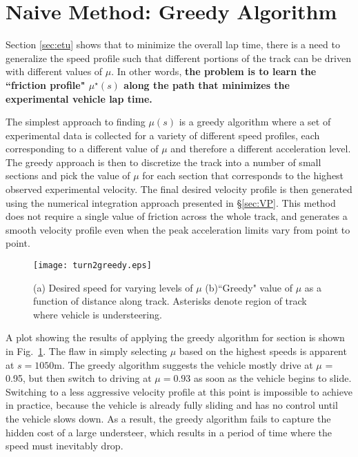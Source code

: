 {{{\section{Naive Method: Greedy Algorithm}
\label{sec:greedy}

Section \ref{sec:etu} shows that to  minimize the overall lap time, there is a need to generalize the speed profile such that different portions of the track can be driven with different
values of $\mu$. In other words, \textbf{the problem is to learn the ``friction profile" $\mu^\star(s)$ along the path that minimizes the experimental vehicle lap time.} 

The simplest approach to finding $\mu(s)$ is a greedy algorithm where a set of experimental data is collected for a variety of different
speed profiles, each corresponding to a different value of $\mu$ and therefore a different acceleration level. The greedy approach is then to discretize
the track into a number of small sections and pick the value of $\mu$ for each section that corresponds to the highest observed experimental velocity.
The final desired velocity profile is then generated using the numerical integration approach presented in \S \ref{sec:VP}. This method does not require a single 
value of friction across the whole track, and generates a smooth velocity profile even when the peak acceleration limits vary from point to point. 

 \begin{figure}[tb]
\centering
\texttt{[image: turn2greedy.eps]}
\caption[Greedy algorithm results for region 2.]{(a) Desired speed for varying levels of $\mu$ (b)``Greedy" value of $\mu$ as a function of distance along track. Asterisks denote
region of track where vehicle is understeering.}
\label{fig:t2g}
\end{figure}

A plot showing the results of applying the greedy algorithm for section  is shown in Fig.~\ref{fig:t2g}. The flaw in simply
selecting $\mu$ based on the highest speeds is apparent at $s = 1050 \mathrm{m}$. The greedy algorithm suggests the vehicle mostly drive at $\mu$ = 0.95,
but then switch to driving at $\mu = 0.93$ as soon as the vehicle begins to slide. Switching to a less aggressive velocity profile at this
point is impossible to achieve in practice, because the vehicle is already fully sliding and has no control until the vehicle slows down.
As a result, the greedy algorithm fails to capture the hidden cost of a large understeer, which results in a period of time where the speed must
inevitably drop. 

}}}
